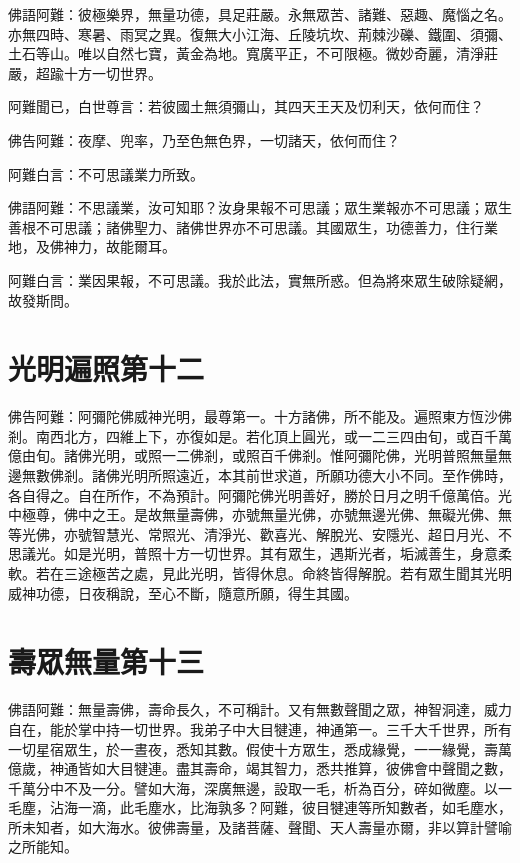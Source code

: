 \documentclass{zhvt-classic}
\begin{document}
佛語阿難：彼極樂界，無量功德，具足莊嚴。永無眾苦、諸難、惡趣、魔惱之名。亦無四時、寒暑、雨冥之異。復無大小江海、丘陵坑坎、荊棘沙礫、鐵圍、須彌、土石等山。唯以自然七寶，黃金為地。寬廣平正，不可限極。微妙奇麗，清淨莊嚴，超踰十方一切世界。

阿難聞已，白世尊言：若彼國土無須彌山，其四天王天及忉利天，依何而住？

佛告阿難：夜摩、兜率，乃至色無色界，一切諸天，依何而住？

阿難白言：不可思議業力所致。

佛語阿難：不思議業，汝可知耶？汝身果報不可思議；眾生業報亦不可思議；眾生善根不可思議；諸佛聖力、諸佛世界亦不可思議。其國眾生，功德善力，住行業地，及佛神力，故能爾耳。

阿難白言：業因果報，不可思議。我於此法，實無所惑。但為將來眾生破除疑網，故發斯問。

\chapter*{光明遍照第十二}

佛告阿難：阿彌陀佛威神光明，最尊第一。十方諸佛，所不能及。遍照東方恆沙佛剎。南西北方，四維上下，亦復如是。若化頂上圓光，或一二三四由旬，或百千萬億由旬。諸佛光明，或照一二佛剎，或照百千佛剎。惟阿彌陀佛，光明普照無量無邊無數佛剎。諸佛光明所照遠近，本其前世求道，所願功德大小不同。至作佛時，各自得之。自在所作，不為預計。阿彌陀佛光明善好，勝於日月之明千億萬倍。光中極尊，佛中之王。是故無量壽佛，亦號無量光佛，亦號無邊光佛、無礙光佛、無等光佛，亦號智慧光、常照光、清淨光、歡喜光、解脫光、安隱光、超日月光、不思議光。如是光明，普照十方一切世界。其有眾生，遇斯光者，垢滅善生，身意柔軟。若在三途極苦之處，見此光明，皆得休息。命終皆得解脫。若有眾生聞其光明威神功德，日夜稱說，至心不斷，隨意所願，得生其國。

\chapter*{壽眾無量第十三}

佛語阿難：無量壽佛，壽命長久，不可稱計。又有無數聲聞之眾，神智洞達，威力自在，能於掌中持一切世界。我弟子中大目犍連，神通第一。三千大千世界，所有一切星宿眾生，於一晝夜，悉知其數。假使十方眾生，悉成緣覺，一一緣覺，壽萬億歲，神通皆如大目犍連。盡其壽命，竭其智力，悉共推算，彼佛會中聲聞之數，千萬分中不及一分。譬如大海，深廣無邊，設取一毛，析為百分，碎如微塵。以一毛塵，沾海一滴，此毛塵水，比海孰多？阿難，彼目犍連等所知數者，如毛塵水，所未知者，如大海水。彼佛壽量，及諸菩薩、聲聞、天人壽量亦爾，非以算計譬喻之所能知。
\end{document}
